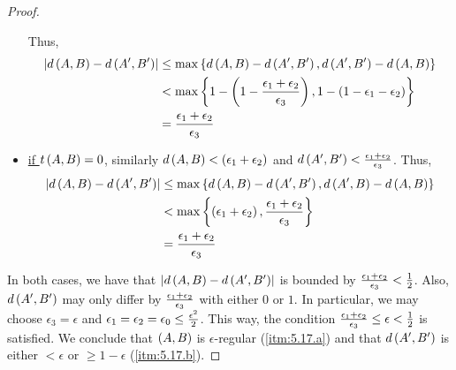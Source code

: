 \begin{proof}
\begin{itemize}
                    Thus,
                    \begin{align*}
                        \left| d \left( A,B \right) - d \left( A',B' \right) \right|
                            & \leq \max \left\{ d \left( A,B \right) - d \left( A',B' \right), d \left( A',B' \right) - d \left( A,B \right) \right\} \\
                            & < \max \left\{  1 - \left( 1 - {{\epsilon_1 + \epsilon_2} \over \epsilon_3} \right),
                                1 - \left( 1 - \epsilon_1 - \epsilon_2 \right) \right\} \\
                            & = {{\epsilon_1 + \epsilon_2} \over \epsilon_3}
                    \end{align*}
                \item \underline{if $t\left( A,B \right) = 0$}, similarly $d\left( A,B \right) < \left( \epsilon_1 + \epsilon_2 \right)$
                    and $d \left( A',B' \right) < {{\epsilon_1 + \epsilon_2} \over \epsilon_3}$.
                    Thus,
                    \begin{align*}
                        \left| d \left( A,B \right) - d \left( A',B' \right) \right|
                            & \leq \max \left\{ d \left( A,B \right) - d \left( A',B' \right), d \left( A',B \right) - d \left( A,B \right) \right\} \\
                            & < \max \left\{ \left( \epsilon_1 + \epsilon_2 \right), {{\epsilon_1 + \epsilon_2} \over \epsilon_3} \right\} \\
                            & = {{\epsilon_1 + \epsilon_2} \over \epsilon_3}
                    \end{align*}
            \end{itemize}
            In both cases, we have that $\left| d \left( A,B \right) - d \left( A',B' \right) \right|$ is bounded by
            ${{\epsilon_1 + \epsilon_2} \over \epsilon_3} < {1 \over 2}$.
            Also, $d \left( A', B' \right)$ may only differ by ${{\epsilon_1 + \epsilon_2} \over \epsilon_3}$ with either
            $0$ or $1$.
            In particular, we may choose $\epsilon_3 = \epsilon$ and $\epsilon_1 = \epsilon_2 = \epsilon_0 \leq {{\epsilon^2} \over 2}$.
            This way, the condition ${{\epsilon_1 + \epsilon_2} \over \epsilon_3} \leq \epsilon < {1 \over 2}$ is satisfied.
            We conclude that $\left( A,B \right)$ is $\epsilon$-regular (\ref{itm:5.17.a}) and that $d \left( A',B' \right)$ is either
            $< \epsilon$ or $\geq 1 - \epsilon$ (\ref{itm:5.17.b}).
        \end{proof}

